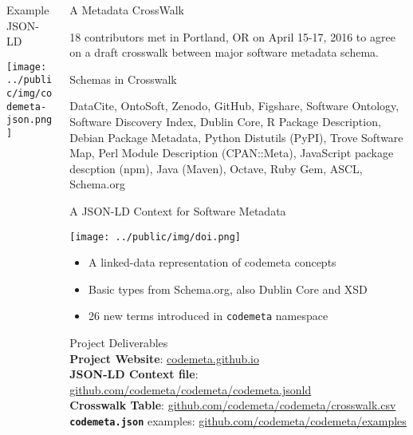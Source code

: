 \documentclass[final,hyperref={pdfpagelabels=false},xcolor=svgnames]{beamer}
\begin{document}
\begin{frame}[t,fragile]
\begin{columns}[t]
\begin{column}{.30\paperwidth}
        \vspace{1cm}
  
        {\LARGE Example JSON-LD}

	\texttt{[image: ../public/img/codemeta-json.png]}

  \end{column}
  \begin{column}{.33\paperwidth} 
  {\LARGE A Metadata CrossWalk}

  18 contributors met in Portland, OR on April 15-17, 2016
  to agree on a draft crosswalk between major software metadata schema.
  

  \vspace{2.5cm}

  {\LARGE Schemas in Crosswalk }

  DataCite, OntoSoft, Zenodo, GitHub, Figshare, Software Ontology,
  Software Discovery Index, Dublin Core, R Package Description,
  Debian Package Metadata, Python Distutils (PyPI), Trove Software
  Map, Perl Module Description (CPAN::Meta), JavaScript package
  descption (npm), Java (Maven), Octave, Ruby Gem, ASCL, Schema.org

  \vspace{2.5cm}


  {\LARGE A JSON-LD Context for Software Metadata }

  \vspace{1cm}
  \texttt{[image: ../public/img/doi.png]}
  \vspace{1cm}

  \begin{itemize}
          \item A linked-data representation of codemeta concepts
          \item Basic types from Schema.org, also Dublin Core and XSD
          \item 26 new terms introduced in \texttt{codemeta} namespace
  \end{itemize}


  \vspace{5cm}
  {\LARGE Project Deliverables}\\
  \vspace{1cm}
  \textbf{Project Website}: \href{https://codemeta.github.io}{codemeta.github.io} \\
  \vspace{1cm}
  \textbf{JSON-LD Context file}: \href{https://github.com/codemeta/codemeta/codemeta.jsonld}{github.com/codemeta/codemeta/codemeta.jsonld} \\
  \vspace{1cm}
  \textbf{Crosswalk Table}: \href{https://github.com/codemeta/codemeta/crosswalk.csv}{github.com/codemeta/codemeta/crosswalk.csv} \\
  \vspace{1cm}
  \textbf{\texttt{codemeta.json}} examples: \href{https://github.com/codemeta/codemeta/examples}{github.com/codemeta/codemeta/examples}


\end{column}
\end{columns}
\end{frame}
\end{document}

